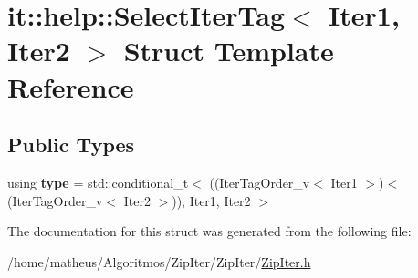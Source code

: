 \hypertarget{structit_1_1help_1_1SelectIterTag_3_01Iter1_00_01Iter2_01_4}{}\section{it\+:\+:help\+:\+:Select\+Iter\+Tag$<$ Iter1, Iter2 $>$ Struct Template Reference}
\label{structit_1_1help_1_1SelectIterTag_3_01Iter1_00_01Iter2_01_4}
\subsection*{Public Types}
\begin{DoxyCompactItemize}
\item 
using {\bfseries type} = std\+::conditional\+\_\+t$<$ ((Iter\+Tag\+Order\+\_\+v$<$ Iter1 $>$)$<$ (Iter\+Tag\+Order\+\_\+v$<$ Iter2 $>$)), Iter1, Iter2 $>$\hypertarget{structit_1_1help_1_1SelectIterTag_3_01Iter1_00_01Iter2_01_4_a3247f7d458a621c9d400d2c9cd913f7e}{}\label{structit_1_1help_1_1SelectIterTag_3_01Iter1_00_01Iter2_01_4_a3247f7d458a621c9d400d2c9cd913f7e}

\end{DoxyCompactItemize}


The documentation for this struct was generated from the following file\+:\begin{DoxyCompactItemize}
\item 
/home/matheus/\+Algoritmos/\+Zip\+Iter/\+Zip\+Iter/\hyperlink{ZipIter_8h}{Zip\+Iter.\+h}\end{DoxyCompactItemize}
